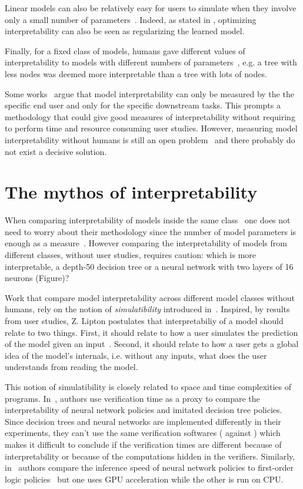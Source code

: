 Linear models can also be relatively easy for users to simulate when they involve only a small number of parameters~\citep{study-4}.
Indeed, as stated in \citep{study-0}, optimizing interpretability can also be seen as regularizing the learned model. 

Finally, for a fixed class of models, humans gave different values of interpretability to models with different numbers of parameters~\citep{study-4}, e.g. a tree with less nodes was deemed more interpretable than a tree with lots of nodes.

Some works~\cite{lipton,rigorous} argue that model interpretability can only be measured by the the specific end user and only for the specific downstream tasks.
This prompts a methodology that could give good measures of interpretability without requiring to perform time and resource consuming user studies.
However, measuring model interpretability without humans is still an open problem~\cite{glanois-survey} and there probably do not exist a decisive solution.

\section{The mythos of interpretability}\label{res:lipton}
When comparing interpretability of models inside the same class~\cite{murtree,blosson,pystreed,vanderlinden2024optimalgreedydecisiontrees,sympol,viper,topin2021iterative} one does not need to worry about their methodology since the number of model parameters is enough as a measure~\cite{study-4}.
However comparing the interpretability of models from different classes, without user studies, requires caution: which is more interpretable, a depth-50 decision tree or a neural network with two layers of 16 neurons (Figure)?

Work that compare model interpretability across different model classes without humans, rely on the notion of \textit{simulatibility} introduced in~\cite{lipton}.
Inspired, by results from user studies, Z. Lipton postulates that interpretabiliy of a model should relate to two things.
First, it should relate to how a user simulates the prediction of the model given an input~\cite{study-6,study-5}.
Second, it should relate to how a user gets a global idea of the model's internals, i.e. without any inputs, what does the user understands from reading the model.

This notion of simulatibility is closely related to space and time complexities of programs.
In~\cite{viper}, authors use verification time as a proxy to compare the interpretability of neural network policies and imitated decision tree policies.
Since decision trees and neural networks are implemented differently in their experiments, they can't use the same verification softwares (\cite{z3} against \cite{maraboupy}) which makes it difficult to conclude if the verification times are different because of interpretability or because of the computations hidden in the verifiers.
Similarly, in~\cite{insight} authors compare the inference speed of neural network policies to first-order logic policies~\cite{nduge} but one uses GPU acceleration while the other is run on CPU.

